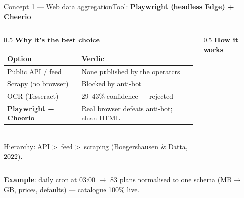 \documentclass[aspectratio=169,11pt]{beamer}
\newcommand{\tool}[1]{{\color{accentdk}\bfseries #1}}
\newcommand{\hd}[1]{\cellcolor{ink}\color{white}\bfseries #1}
\begin{document}
\begin{frame}{Concept 1 — Web data aggregation}{Tool: \tool{Playwright (headless Edge) + Cheerio}}
\begin{columns}[T]
\begin{column}{0.5\textwidth}
  {\color{ink}\bfseries\small Why it's the best choice}\\[4pt]
  {\scriptsize
  \renewcommand{\arraystretch}{1.25}
  \begin{tabular}{@{}p{2.2cm} p{4.2cm}@{}}
  \toprule
  \rowcolor{ink}\hd{Option} & \hd{Verdict} \\
  \midrule
  Public API / feed & None published by the operators \\
  Scrapy (no browser) & Blocked by anti-bot \\
  OCR (Tesseract) & 29--43\% confidence — rejected \\
  \rowcolor{accentlt}\color{accentdk}\bfseries Playwright + Cheerio & \color{accentdk}Real browser defeats anti-bot; clean HTML \\
  \bottomrule
  \end{tabular}}\\[6pt]
  {\color{sec}\scriptsize Hierarchy: API \textgreater\ feed \textgreater\ scraping (Boegershausen \& Datta, 2022).}
\end{column}
\begin{column}{0.5\textwidth}
  {\color{ink}\bfseries\small How it works}\\[6pt]
  \centering
\end{column}
\end{columns}
\vspace{2pt}
{\color{muted}\scriptsize \textbf{Example:} daily cron at 03:00 $\rightarrow$ 83 plans normalised to one schema (MB$\rightarrow$GB, prices, defaults) — catalogue 100\% live.}
\end{frame}
\end{document}
